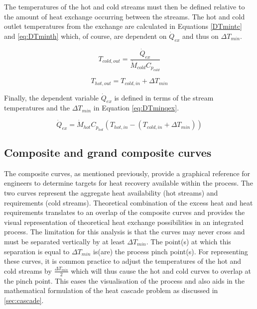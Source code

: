 The temperatures of the hot and cold streams must then be defined relative to the amount of heat exchange occurring between the streams. The hot and cold outlet temperatures from the exchange are calculated in Equations \ref{DTmintc} and \ref{eq:DTminth} which, of course, are dependent on $\dot Q_{ex}$ and thus on $\Delta T_{min}$.

\begin{equation}\label{eq:DTmintc}
T_{cold,out}=\frac{\dot Q_{ex}}{\dot M_{cold}C_{p_{cold}}}
\end{equation}

\begin{equation}\label{eq:DTminth}
T_{hot,out}=T_{cold,in}+\Delta T_{min}
\end{equation}

Finally, the dependent variable $\dot Q_{ex}$ is defined in terms of the stream temperatures and the $\Delta T_{min}$ in Equation \ref{eq:DTminqex}.

\begin{equation}\label{eq:DTminqex}
\dot Q_{ex} = \dot M_{hot}C_{p_{hot}}(T_{hot,in}-(T_{cold,in}+\Delta T_{min}))
\end{equation}

\subsection{Composite and grand composite curves}\label{sec:ccs}

The composite curves, as mentioned previously, provide a graphical reference for engineers to determine targets for heat recovery available within the process. The two curves represent the aggregate heat availability (hot streams) and requirements (cold streams). Theoretical combination of the excess heat and heat requirements translates to an overlap of the composite curves and provides the visual representation of theoretical heat exchange possibilities in an integrated process. The limitation for this analysis is that the curves may never cross and must be separated vertically by at least $\Delta T_{min}$. The point(s) at which this separation is equal to $\Delta T_{min}$ is(are) the process pinch point(s). For representing these curves, it is common practice to adjust the temperatures of the hot and cold streams by $\frac{\Delta T_{min}}{2}$ which will thus cause the hot and cold curves to overlap at the pinch point. This eases the visualisation of the process and also aids in the mathematical formulation of the heat cascade problem as discussed in \ref{sec:cascade}.

